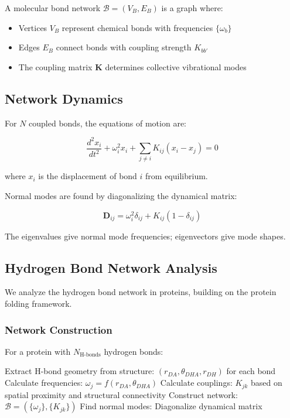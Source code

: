 \begin{definition}
A molecular bond network $\mathcal{B} = (V_B, E_B)$ is a graph where:
\begin{itemize}
\item Vertices $V_B$ represent chemical bonds with frequencies $\{\omega_b\}$
\item Edges $E_B$ connect bonds with coupling strength $K_{bb'}$
\item The coupling matrix $\mathbf{K}$ determines collective vibrational modes
\end{itemize}
\end{definition}

\subsection{Network Dynamics}

For $N$ coupled bonds, the equations of motion are:

\begin{equation}
\frac{d^2 x_i}{dt^2} + \omega_i^2 x_i + \sum_{j \neq i} K_{ij}(x_i - x_j) = 0
\end{equation}

where $x_i$ is the displacement of bond $i$ from equilibrium.

Normal modes are found by diagonalizing the dynamical matrix:

\begin{equation}
\mathbf{D}_{ij} = \omega_i^2\delta_{ij} + K_{ij}(1 - \delta_{ij})
\end{equation}

The eigenvalues give normal mode frequencies; eigenvectors give mode shapes.

\subsection{Hydrogen Bond Network Analysis}

We analyze the hydrogen bond network in proteins, building on the protein folding framework.

\subsubsection{Network Construction}

For a protein with $N_{\text{H-bonds}}$ hydrogen bonds:

\begin{algorithmic}[1]
\State Extract H-bond geometry from structure: $(r_{DA}, \theta_{DHA}, r_{DH})$ for each bond
\State Calculate frequencies: $\omega_j = f(r_{DA}, \theta_{DHA})$
\State Calculate couplings: $K_{jk}$ based on spatial proximity and structural connectivity
\State Construct network: $\mathcal{B} = (\{\omega_j\}, \{K_{jk}\})$
\State Find normal modes: Diagonalize dynamical matrix
\end{algorithmic}

